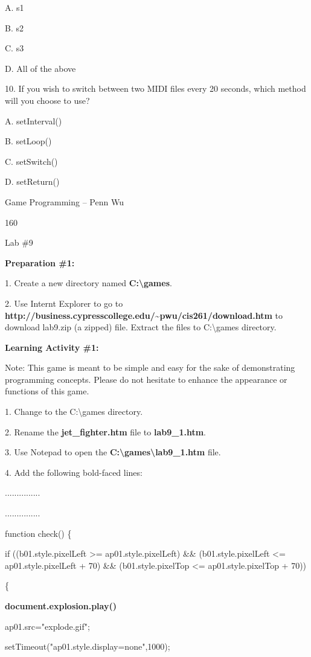 \documentclass[
]{article}
\begin{document}
A. s1

B. s2

C. s3

D. All of the above

10. If you wish to switch between two MIDI files every 20 seconds, which
method will you choose to use?

A. setInterval()

B. setLoop()

C. setSwitch()

D. setReturn()

Game Programming -- Penn Wu

160

\protect\hypertarget{index_split_010.htmlux5cux23p161}{}{}

Lab \#9

\textbf{Preparation \#1:}

1. Create a new directory named \textbf{C:\textbackslash games}.

2. Use Internt Explorer to go to
\textbf{http://business.cypresscollege.edu/\textasciitilde pwu/cis261/download.htm}
to download lab9.zip (a zipped) file. Extract the files to
C:\textbackslash games directory.

\textbf{Learning Activity \#1:}

Note: This game is meant to be simple and easy for the sake of
demonstrating programming concepts. Please do not hesitate to enhance
the appearance or functions of this game.

1. Change to the C:\textbackslash games directory.

2. Rename the \textbf{jet\_fighter.htm} file to \textbf{lab9\_1.htm}.

3. Use Notepad to open the
\textbf{C:\textbackslash games\textbackslash lab9\_1.htm} file.

4. Add the following bold-faced lines:

...............

...............

function check() \{

if ((b01.style.pixelLeft \textgreater= ap01.style.pixelLeft) \&\&
(b01.style.pixelLeft \textless= ap01.style.pixelLeft + 70) \&\&
(b01.style.pixelTop \textless= ap01.style.pixelTop + 70))

\{

\textbf{document.explosion.play()}

ap01.src="explode.gif";

setTimeout("ap01.style.display=\textquotesingle none\textquotesingle",1000);
\end{document}
